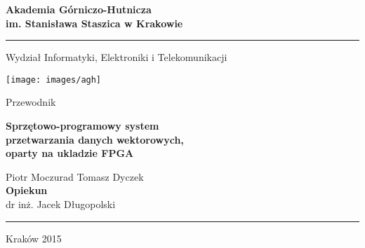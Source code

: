 \begin{titlepage}
    \begin{center}
		\fontsize{17pt}{20pt}\selectfont
        \textbf{Akademia Górniczo-Hutnicza\\im. Stanisława Staszica w Krakowie}
        \rule{\textwidth}{1.5pt}\par
        \vspace{0.5cm}
        Wydział Informatyki, Elektroniki i Telekomunikacji
        
        \vspace{1.5cm}

        \texttt{[image: images/agh]}
 		
 		\vspace{1.5cm}
 		
 		Przewodnik
 		
 		\vspace{0.5cm}
	 	\textbf{Sprzętowo-programowy system\\przetwarzania danych wektorowych,\\oparty na ukladzie FPGA}
		
		Piotr Moczurad
		Tomasz Dyczek
		\vspace{1.5cm}\\
		\textbf{Opiekun}\\
		dr inż. Jacek Długopolski
		\rule{\textwidth}{1.5pt}\par
		Kraków 2015
		
        
    \end{center}
\end{titlepage}